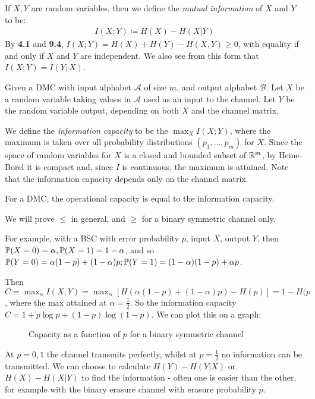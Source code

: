 \documentclass[10pt,a4paper]{article}
\begin{document}
If $X,Y$ are random variables, then we define the \emph{mutual information} of $X$ and $Y$ to be:
\begin{align*}
I(X;Y) \coloneqq H(X) - H(X|Y)
\end{align*}
By \textbf{4.1} and \textbf{9.4}, $I(X;Y) = H(X) + H(Y) - H(X,Y) \geq 0$, with equality if and only if $X$ and $Y$ are independent. We also see from this form that $I(X;Y) = I(Y;X)$.

Given a DMC with input alphabet $\mathscr{A}$ of size $m$, and output alphabet $\mathscr{B}$. Let $X$ be a random variable taking values in $\mathscr{A}$ used as an input to the channel. Let $Y$ be the random variable output, depending on both $X$ and the channel matrix.

We define the \emph{information capacity} to be the $\max_X I(X;Y)$, where the maximum is taken over all probability distributions $(p_1, \ldots, p_m)$ for $X$. Since the space of random variables for $X$ is a closed and bounded subset of $\R^m$, by Heine-Borel it is compact and, since $I$ is continuous, the maximum is attained. Note that the information capacity depends only on the channel matrix.

\begin{theorem}
For a DMC, the operational capacity is equal to the information capacity.
\end{theorem}
We will prove $\leq$ in general, and $\geq$ for a binary symmetric channel only. 

For example, with a BSC with error probability $p$, input $X$, output $Y$, then $\P(X=0) = \alpha, \P(X=1) = 1-\alpha$, and so $\P(Y=0) = \alpha(1-p) + (1-\alpha)p; \P(Y=1) = (1-\alpha)(1-p) + \alpha p$.

Then $C = \max_{\alpha} I(X;Y) = \max_\alpha \left[H(\alpha(1-p) + (1-\alpha)p) - H(p)\right] = 1-H(p$, where the max attained at $\alpha = \frac12$. So the information capacity $C = 1+p\log p + (1-p)\log(1-p)$. We can plot this on a graph:
\begin{figure}[H]
\centering
{}
\caption{Capacity as a function of $p$ for a binary symmetric channel}
\end{figure}
At $p=0,1$ the channel transmits perfectly, whilst at $p=\frac{1}{2}$ no information can be transmitted. We can choose to calculate $H(Y)-H(Y|X)$ or $H(X)-H(X|Y)$ to find the information - often one is easier than the other, for example with the binary erasure channel with erasure probability $p$.
\end{document}
